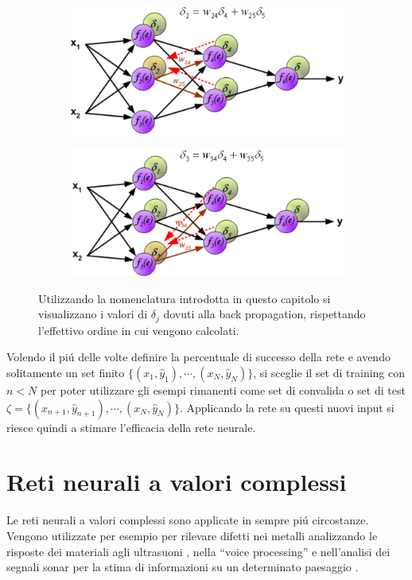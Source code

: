 \documentclass[a4paper,12pt]{report}
\begin{document}
\begin{figure}[h!]
\begin{subfigure}[b]{0.45\linewidth}
  \end{subfigure}
  \\
  \begin{subfigure}[b]{0.45\linewidth}
   \includegraphics[width=\linewidth]{BackPrope.png}
  \end{subfigure}
  \begin{subfigure}[b]{0.45\linewidth}
   \includegraphics[width=\linewidth]{BackPropf.png}
  \end{subfigure}
  \caption{Utilizzando la nomenclatura introdotta in questo capitolo si visualizzano i valori di $\delta_j$ dovuti alla back propagation, rispettando l'effettivo ordine in cui vengono calcolati.}
 \end{figure}
 Volendo il pi\'u delle volte definire la percentuale di successo della rete e avendo solitamente un set finito $\{(x_1,\widehat{y}_1), \cdots , (x_N,\widehat{y}_N)\}$, si sceglie il set di training con $n<N$ per poter utilizzare gli esempi rimanenti come set di convalida o set di test $\zeta = \{(x_{n+1},\widehat{y}_{n+1}), \cdots , (x_N,\widehat{y}_N)\}$. 
 Applicando la rete su questi nuovi input si riesce quindi a stimare l'efficacia della rete neurale.

 
 \chapter{Reti neurali a valori complessi}
 Le reti neurali a valori complessi sono applicate in sempre pi\'u circostanze. 
 Vengono utilizzate per esempio per rilevare difetti nei metalli analizzando le risposte dei materiali agli ultrasuoni \cite{birx1993complex}, nella ``voice processing'' \cite{sawada2003polar} e nell'analisi dei segnali sonar per la stima di informazioni su un determinato paesaggio \cite{yamaki2008singular}.
 
\end{document}
